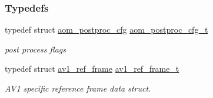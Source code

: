 \subsubsection*{Typedefs}
\begin{DoxyCompactItemize}
\item 
typedef struct \hyperlink{structaom__postproc__cfg}{aom\+\_\+postproc\+\_\+cfg} \hyperlink{group__aom_gaf8a9b796d86228c9badeee6f13e5196b}{aom\+\_\+postproc\+\_\+cfg\+\_\+t}
\begin{DoxyCompactList}\small\item\em post process flags \end{DoxyCompactList}\item 
typedef struct \hyperlink{structav1__ref__frame}{av1\+\_\+ref\+\_\+frame} \hyperlink{group__aom_ga8de31c9dd61cb25763c30066885fc9b6}{av1\+\_\+ref\+\_\+frame\+\_\+t}
\begin{DoxyCompactList}\small\item\em A\+V1 specific reference frame data struct. \end{DoxyCompactList}\end{DoxyCompactItemize}
